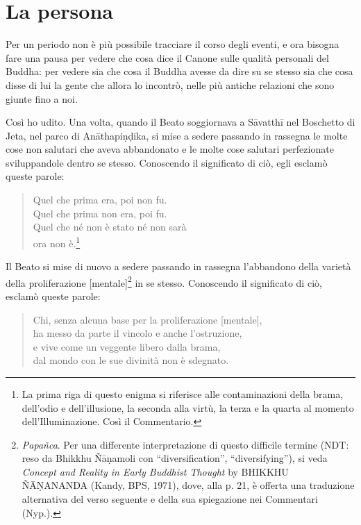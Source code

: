 \chapter{La persona}

 Per un periodo non è più possibile tracciare il
corso degli eventi, e ora bisogna fare una pausa per vedere che cosa dice il
Canone sulle qualità personali del Buddha: per vedere sia che cosa il Buddha
avesse da dire su se stesso sia che cosa disse di lui la gente che allora lo
incontrò, nelle più antiche relazioni che sono giunte fino a noi.

 Così ho udito. Una volta, quando il Beato soggiornava a
Sāvatthī nel Boschetto di Jeta, nel parco di Anāthapiṇḍika, si mise a sedere
passando in rassegna le molte cose non salutari che aveva abbandonato e le molte
cose salutari perfezionate sviluppandole dentro se stesso. Conoscendo il
significato di ciò, egli esclamò queste parole:

\begin{quote}
Quel che prima era, poi non fu. \\
Quel che prima non era, poi fu. \\
Quel che né non è stato né non sarà \\
ora non è.\footnote{La prima riga di questo enigma si riferisce alle contaminazioni della brama, dell’odio e dell’illusione, la seconda alla virtù, la terza e la quarta al momento dell’Illuminazione. Così il Commentario.}
\end{quote}


Il Beato si mise di nuovo a sedere passando in rassegna l’abbandono della
varietà della proliferazione [mentale]\footnote{\emph{Papañca}. Per una
  differente interpretazione di questo difficile termine (NDT: reso da Bhikkhu
  Ñāṇamoli con “diversification”, “diversifying”), si veda \emph{Concept and
    Reality in Early Buddhist Thought} by BHIKKHU ÑĀṆANANDA (Kandy, BPS, 1971),
  dove, alla p. 21, è offerta una traduzione alternativa del verso seguente e
  della sua spiegazione nei Commentari (Nyp.).} in se stesso. Conoscendo il
significato di ciò, esclamò queste parole:

\begin{quote}
Chi, senza alcuna base per la proliferazione [mentale], \\
ha messo da parte il vincolo e anche l’ostruzione, \\
e vive come un veggente libero dalla brama, \\
dal mondo con le sue divinità non è sdegnato.
\end{quote}


